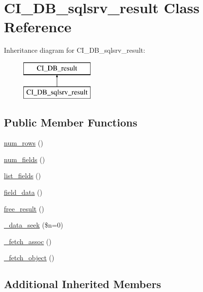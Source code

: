 \hypertarget{class_c_i___d_b__sqlsrv__result}{\section{C\-I\-\_\-\-D\-B\-\_\-sqlsrv\-\_\-result Class Reference}
\label{class_c_i___d_b__sqlsrv__result}
}
Inheritance diagram for C\-I\-\_\-\-D\-B\-\_\-sqlsrv\-\_\-result\-:\begin{figure}[H]
\begin{center}
\leavevmode
\includegraphics[height=2.000000cm]{class_c_i___d_b__sqlsrv__result}
\end{center}
\end{figure}
\subsection*{Public Member Functions}
\begin{DoxyCompactItemize}
\item 
\hyperlink{class_c_i___d_b__sqlsrv__result_a218657c303ee499b97710ab0cd2f5d6e}{num\-\_\-rows} ()
\item 
\hyperlink{class_c_i___d_b__sqlsrv__result_af831bf363e4d7d661a717a4932af449d}{num\-\_\-fields} ()
\item 
\hyperlink{class_c_i___d_b__sqlsrv__result_a50b54eb4ea7cfd039740f532988ea776}{list\-\_\-fields} ()
\item 
\hyperlink{class_c_i___d_b__sqlsrv__result_a84bffd65e53902ade1591716749a33e3}{field\-\_\-data} ()
\item 
\hyperlink{class_c_i___d_b__sqlsrv__result_aad2d98d6beb3d6095405356c6107b473}{free\-\_\-result} ()
\item 
\hyperlink{class_c_i___d_b__sqlsrv__result_aeba9dd69307793342d1c81ccb3e55ff9}{\-\_\-data\-\_\-seek} (\$n=0)
\item 
\hyperlink{class_c_i___d_b__sqlsrv__result_a43a9a92817f1334a1c10752ec44275a0}{\-\_\-fetch\-\_\-assoc} ()
\item 
\hyperlink{class_c_i___d_b__sqlsrv__result_a236bae79bb43606aa86598719b281c1f}{\-\_\-fetch\-\_\-object} ()
\end{DoxyCompactItemize}
\subsection*{Additional Inherited Members}



